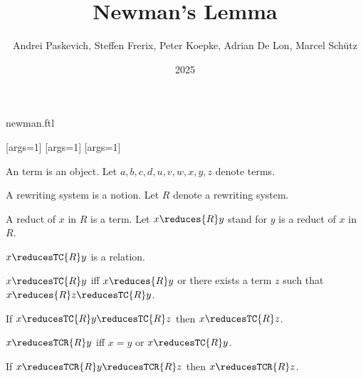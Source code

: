 \documentclass{stex}
\title{Newman's Lemma}
\author{Andrei Paskevich, Steffen Frerix, Peter Koepke, Adrian De Lon, Marcel Schütz}
\date{2025}
\begin{document}
\begin{smodule}{newman.ftl}
\maketitle
  

[args=1]{}
[args=1]{}
[args=1]{}


\begin{forthel}

  \begin{signature}[title=Term]
    An term is an object.
    Let $a,b,c,d,u,v,w,x,y,z$ denote terms.
  \end{signature}

  \begin{signature}[title=Rewriting System]
    A rewriting system is a notion.
    Let $R$ denote a rewriting system.
  \end{signature}

  \begin{signature}[title=Reduct]
    A reduct of $x$ in $R$ is a term.
    Let $x \reduces{R} y$ stand for $y$ is a reduct of $x$ in $R$.
  \end{signature}

  \begin{signature}
    $x \reducesTC{R} y$ is a relation.
  \end{signature}

  \begin{axiom}
    $x \reducesTC{R} y$ iff $x \reduces{R} y$ or there exists a term $z$ such that $x \reduces{R} z \reducesTC{R} y$.
  \end{axiom}

  \begin{axiom}
    If $x \reducesTC{R} y \reducesTC{R} z$ then $x \reducesTC{R} z$.
  \end{axiom}

  \begin{definition}
    $x \reducesTCR{R} y$ iff $x = y$ or $x \reducesTC{R} y$.
  \end{definition}

  \begin{lemma}
    If $x \reducesTCR{R} y \reducesTCR{R} z$ then $x \reducesTCR{R} z$.
  \end{lemma}


\end{forthel}
\end{smodule}
\end{document}
